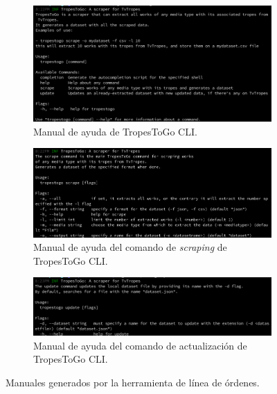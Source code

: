 \begin{figure}[!h]
    \centering
    \begin{subfigure}{\textwidth}
      \includegraphics[width=\linewidth]{img/cli.png}
      \caption{Manual de ayuda de TropesToGo CLI.}
    \end{subfigure}
    \begin{subfigure}{\textwidth}
      \includegraphics[width=\linewidth]{img/cli_scraper.png}
      \caption{Manual de ayuda del comando de \textit{scraping} de TropesToGo CLI.}
    \end{subfigure}
    \begin{subfigure}{\textwidth}
        \includegraphics[width=\linewidth]{img/cli_update.png}
        \caption{Manual de ayuda del comando de actualización de TropesToGo CLI.}
      \end{subfigure}
    \caption{Manuales generados por la herramienta de línea de órdenes.}
    \label{fig:cli}
\end{figure}


